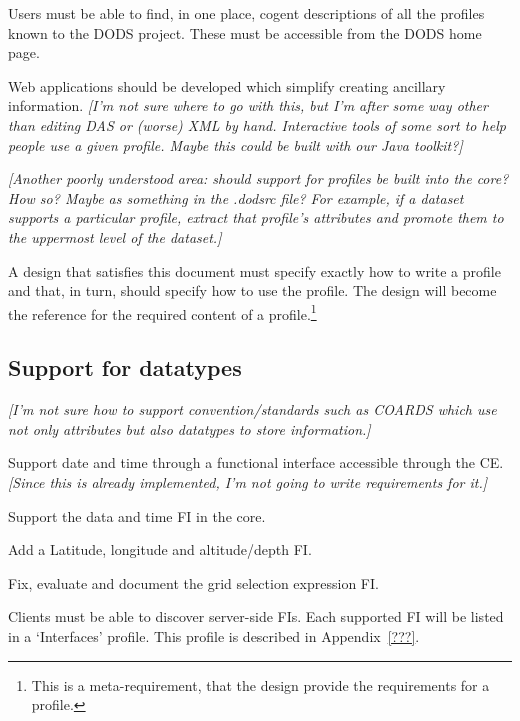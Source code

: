 Users must be able to find, in one place, cogent descriptions of all
the profiles known to the DODS project. These must be accessible from
the DODS home page. 

Web applications should be developed which simplify creating ancillary
information. \emph{[I'm not sure where to go with this, but I'm after some
way other than editing DAS or (worse) XML by hand. Interactive tools
of some sort to help people use a given profile. Maybe this could be
built with our Java toolkit?]}

\emph{[Another poorly understood area: should support for profiles be
built into the core? How so? Maybe as something in the .dodsrc file?
For example, if a dataset supports a particular profile, extract that
profile's attributes and promote them to the uppermost level of the
dataset.]}

A design that satisfies this document must specify exactly how to
write a profile and that, in turn, should specify how to use the
profile. The design will become the reference for the required content
of a profile.\footnote{This is a meta-requirement, that the design
provide the requirements for a profile.}

\subsection{Support for datatypes}
\emph{[I'm not sure how to support convention/standards such as COARDS
which use not only attributes but also datatypes to store
information.]}

Support date and time through a functional interface accessible
through the CE. \emph{[Since this is already implemented, I'm not
going to write requirements for it.]}

Support the data and time FI in the core.

Add a Latitude, longitude and altitude/depth FI.

Fix, evaluate and document the grid selection expression FI.

Clients must be able to discover server-side FIs. Each supported FI
will be listed in a `Interfaces' profile. This profile is described in Appendix~\ref{???}.


